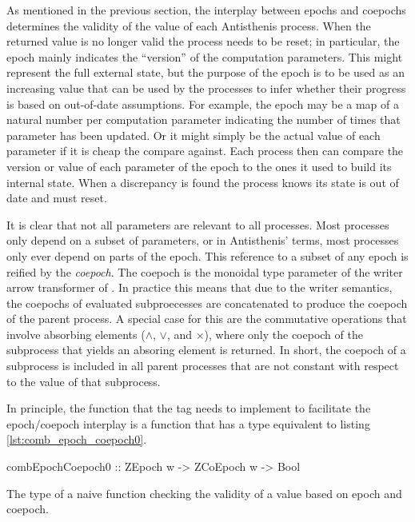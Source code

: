As mentioned in the previous section, the interplay between epochs and
coepochs determines the validity of the value of each Antisthenis
process. When the returned value is no longer valid the process needs
to be reset; in particular, the epoch mainly indicates the ``version''
of the computation parameters. This might represent the full external
state, but the purpose of the epoch is to be used as an increasing
value that can be used by the processes to infer whether their
progress is based on out-of-date assumptions. For example, the epoch
may be a map of a natural number per computation parameter indicating
the number of times that parameter has been updated. Or it might
simply be the actual value of each parameter if it is cheap the
compare against. Each process then can compare the version or value of
each parameter of the epoch to the ones it used to build its internal
state. When a discrepancy is found the process knows its state is out
of date and must reset.

It is clear that not all parameters are relevant to all processes.
Most processes only depend on a subset of parameters, or in
Antisthenis' terms, most processes only ever depend on parts of the
epoch. This reference to a subset of any epoch is reified by the
\emph{coepoch}. The coepoch is the monoidal type parameter of the writer
arrow transformer of .  In practice this means that due
to the writer semantics, the coepochs of evaluated subproecesses are
concatenated to produce the coepoch of the parent process. A special
case for this are the commutative operations that involve absorbing
elements (\(\land\), \(\lor\), and \(\times\)), where only the coepoch
of the subprocess that yields an absoring element is returned. In
short, the coepoch of a subprocess is included in all parent processes
that are not constant with respect to the value of that subprocess.

In principle, the function that the  tag needs to
implement to facilitate the epoch/coepoch interplay is a function that
has a type equivalent to listing \ref{lst:comb_epoch_coepoch0}.

\begin{code}
\begin{haskellcode}
combEpochCoepoch0 :: ZEpoch w -> ZCoEpoch w -> Bool
\end{haskellcode}
  \caption{\label{lst:comb_epoch_coepoch0}The type of a naive function
    checking the validity of a value based on epoch and coepoch.}
\end{code}

